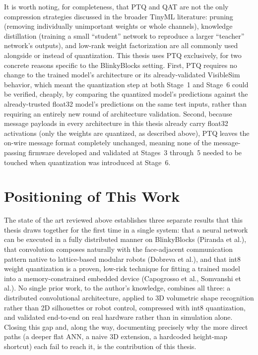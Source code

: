 \documentclass[12pt,a4paper]{report}
\begin{document}
It is worth noting, for completeness, that PTQ and QAT are not the only compression strategies discussed in the broader TinyML literature: pruning (removing individually unimportant weights or whole channels), knowledge distillation (training a small ``student'' network to reproduce a larger ``teacher'' network's outputs), and low-rank weight factorization are all commonly used alongside or instead of quantization. This thesis uses PTQ exclusively, for two concrete reasons specific to the BlinkyBlocks setting. First, PTQ requires no change to the trained model's architecture or its already-validated VisibleSim behavior, which meant the quantization step at both Stage~1 and Stage~6 could be verified, cheaply, by comparing the quantized model's predictions against the already-trusted float32 model's predictions on the same test inputs, rather than requiring an entirely new round of architecture validation. Second, because message payloads in every architecture in this thesis already carry float32 activations (only the weights are quantized, as described above), PTQ leaves the on-wire message format completely unchanged, meaning none of the message-passing firmware developed and validated at Stages~3 through~5 needed to be touched when quantization was introduced at Stage~6.

\section{Positioning of This Work}

The state of the art reviewed above establishes three separate results that this thesis draws together for the first time in a single system: that a neural network can be executed in a fully distributed manner on BlinkyBlocks (Piranda et al.), that convolution composes naturally with the face-adjacent communication pattern native to lattice-based modular robots (Dobreva et al.), and that int8 weight quantization is a proven, low-risk technique for fitting a trained model into a memory-constrained embedded device (Capogrosso et al., Somvanshi et al.). No single prior work, to the author's knowledge, combines all three: a distributed convolutional architecture, applied to 3D volumetric shape recognition rather than 2D silhouettes or robot control, compressed with int8 quantization, and validated end-to-end on real hardware rather than in simulation alone. Closing this gap and, along the way, documenting precisely why the more direct paths (a deeper flat ANN, a naive 3D extension, a hardcoded height-map shortcut) each fail to reach it, is the contribution of this thesis.
\end{document}
